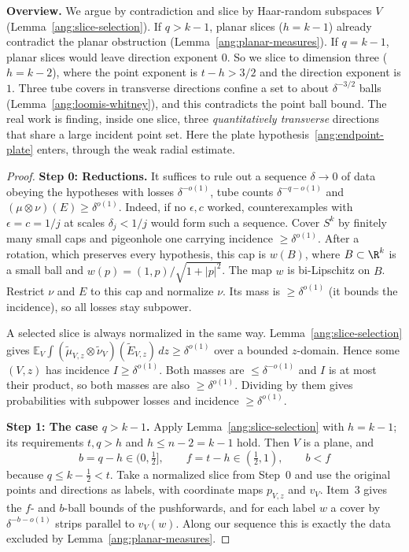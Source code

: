 \noindent\textbf{Overview.} We argue by contradiction and slice by Haar-random subspaces $V$ (Lemma~\ref{ang:slice-selection}). If $q>k-1$, planar slices ($h=k-1$) already contradict the planar obstruction (Lemma~\ref{ang:planar-measures}). If $q=k-1$, planar slices would leave direction exponent $0$. So we slice to dimension three ($h=k-2$), where the point exponent is $t-h>3/2$ and the direction exponent is $1$. Three tube covers in transverse directions confine a set to about $\delta^{-3/2}$ balls (Lemma~\ref{ang:loomis-whitney}), and this contradicts the point ball bound. The real work is finding, inside one slice, three \emph{quantitatively transverse} directions that share a large incident point set. Here the plate hypothesis~\eqref{ang:endpoint-plate} enters, through the weak radial estimate.

\begin{proof}
\textbf{Step 0: Reductions.} It suffices to rule out a sequence $\delta\to0$ of data obeying the hypotheses with losses $\delta^{-o(1)}$, tube counts $\delta^{-q-o(1)}$ and $(\mu\otimes\nu)(E)\ge\delta^{o(1)}$. Indeed, if no $\epsilon,c$ worked, counterexamples with $\epsilon=c=1/j$ at scales $\delta_j<1/j$ would form such a sequence. Cover $S^k$ by finitely many small caps and pigeonhole one carrying incidence $\ge\delta^{o(1)}$. After a rotation, which preserves every hypothesis, this cap is $w(B)$, where $B\subset\R^k$ is a small ball and $w(p)=(1,p)/\sqrt{1+|p|^2}$. The map $w$ is bi-Lipschitz on $B$. Restrict $\nu$ and $E$ to this cap and normalize $\nu$. Its mass is $\ge\delta^{o(1)}$ (it bounds the incidence), so all losses stay subpower.

A selected slice is always normalized in the same way. Lemma~\ref{ang:slice-selection} gives $\mathbb E_V\int(\widetilde\mu_{V,z}\otimes\widetilde\nu_V)(\widetilde E_{V,z})\,dz\ge\delta^{o(1)}$ over a bounded $z$-domain. Hence some $(V,z)$ has incidence $I\ge\delta^{o(1)}$. Both masses are $\le\delta^{-o(1)}$ and $I$ is at most their product, so both masses are also $\ge\delta^{o(1)}$. Dividing by them gives probabilities with subpower losses and incidence $\ge\delta^{o(1)}$.

\textbf{Step 1: The case $q>k-1$.} Apply Lemma~\ref{ang:slice-selection} with $h=k-1$; its requirements $t,q>h$ and $h\le n-2=k-1$ hold. Then $V$ is a plane, and
\[
 b=q-h\in(0,\tfrac12],\qquad f=t-h\in(\tfrac12,1),\qquad b<f
\]
because $q\le k-\tfrac12<t$. Take a normalized slice from Step~0 and use the original points and directions as labels, with coordinate maps $p_{V,z}$ and $v_V$. Item~3 gives the $f$- and $b$-ball bounds of the pushforwards, and for each label $w$ a cover by $\delta^{-b-o(1)}$ strips parallel to $v_V(w)$. Along our sequence this is exactly the data excluded by Lemma~\ref{ang:planar-measures}.


\end{proof}
